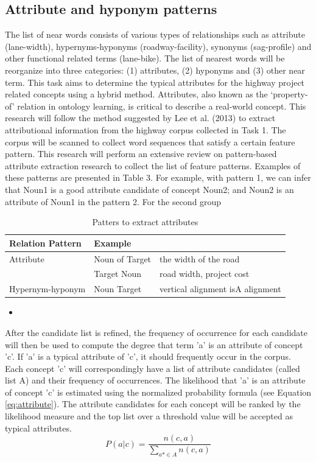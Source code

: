 \documentclass[Journal, InsideFigs, DoubleSpace]{ascelike} %
\begin{document}
\subsection{Attribute and hyponym patterns}
%
The list of near words consists of various types of relationships such as attribute (lane-width), hypernyms-hyponyms (roadway-facility), synonyms (sag-profile) and other functional related terms (lane-bike). The list of nearest words will be reorganize into three categories: (1) attributes, (2) hyponyms and (3) other near term. This task aims to determine the typical attributes for the highway project related concepts using a hybrid method. Attributes, also known as the ‘property-of’ relation in ontology learning, is critical to describe a real-world concept. This research will follow the method suggested by Lee et al. (2013) \cite{lee13} to extract attributional information from the highway corpus collected in Task 1. The corpus will be scanned to collect word sequences that satisfy a certain feature pattern. This research will perform an extensive review on pattern-based attribute extraction research to collect the list of feature patterns. Examples of these patterns are presented in Table 3. For example, with pattern 1, we can infer that Noun1 is a good attribute candidate of concept Noun2; and Noun2 is an attribute of Noun1 in the pattern 2. For the second group
%
\begin{table} [t]
	\caption{Patters to extract attributes}
	\label{table:attribute_pattern}
	\centering
	\small
	\renewcommand{\arraystretch}{1.25}
	\begin{tabular}{l l l}
		\hline
		\textbf{Relation} \textbf{Pattern} & \textbf{Example}\\
		\hline
		Attribute &	Noun of Target & the width of the road\\
		& Target Noun	&	road width, project cost\\
		Hypernym-hyponym & Noun Target & vertical alignment isA alignment\\
		\hline
	\end{tabular}
	\normalsize
\end{table}
%
\begin{itemize}
	\item 
\end{itemize}
%
After the candidate list is refined, the frequency of occurrence for each candidate will then be used to compute the degree that term 'a' is an attribute of concept 'c'. If 'a' is a typical attribute of 'c', it should frequently occur in the corpus. Each concept 'c' will correspondingly have a list of attribute candidates (called list A) and their frequency of occurrences. The likelihood that 'a' is an attribute of concept 'c' is estimated using the normalized probability formula (see Equation \ref{eq:attribute}). The attribute candidates for each concept will be ranked by the likelihood measure and the top list over a threshold value will be accepted as typical attributes. 
\begin{equation}
P(a|c)=\frac{n(c,a)}{\sum_{a* \in A} n(c,a)}
\label{eq:attribute}
\end{equation}
\end{document}
